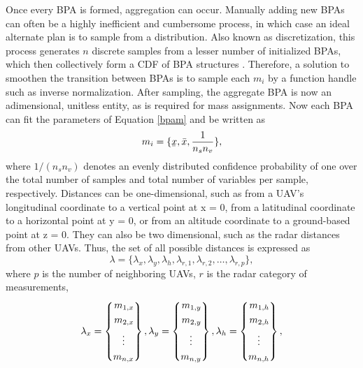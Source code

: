 \documentclass[12pt]{uthesis-v12}  %
\newcommand{\ubar}[1]{\underaccent{\bar}{#1}}
\begin{document}
Once every BPA is formed, aggregation can occur. Manually adding new BPAs can often be a highly inefficient and cumbersome process, in which case an ideal alternate plan is to sample from a distribution. Also known as discretization, this process generates $n$ discrete samples from a lesser number of initialized BPAs, which then collectively form a CDF of BPA structures \cite{tonon}. Therefore, a solution to smoothen the transition between BPAs is to sample each $m_i$ by a function handle such as inverse normalization. After sampling, the aggregate BPA is now an adimensional, unitless entity, as is required for mass assignments. Now each BPA can fit the parameters of Equation \ref{bpam} and be written as
\begin{equation}
m_i = \{\ubar{x}, \bar{x}, \frac{1}{n_s n_v}\},
\label{mi}
\end{equation}
where $1/(n_s n_v)$ denotes an evenly distributed confidence probability of one over the total number of samples and total number of variables per sample, respectively. Distances can be one-dimensional, such as from a UAV's longitudinal coordinate to a vertical point at x = 0, from a latitudinal coordinate to a horizontal point at y = 0, or from an altitude coordinate to a ground-based point at z = 0. They can also be two dimensional, such as the radar distances from other UAVs. Thus, the set of all possible distances is expressed as
\begin{equation}
\lambda = \{ \lambda_x, \lambda_y, \lambda_h, \lambda_{r,1}, \lambda_{r,2}, \dots, \lambda_{r,p} \},
\label{lambda}
\end{equation}
where $p$ is the number of neighboring UAVs, $r$ is the radar category of measurements,
\begin{equation}
\lambda_{x} = \left\{
\begin{aligned}
m_{1,x} \\
m_{2,x} \\
\vdotswithin{m_{n,x}} \\
m_{n,x} 
\end{aligned}
\right\},
\lambda_{y} = \left\{
\begin{aligned}
m_{1,y} \\
m_{2,y} \\
\vdotswithin{m_{n,y}} \\
m_{n,y} 
\end{aligned}
\right\},
\lambda_{h} = \left\{
\begin{aligned}
m_{1,h} \\
m_{2,h} \\
\vdotswithin{m_{n,h}} \\
m_{n,h}
\end{aligned}
\right\},
\label{m4}
\end{equation}
\end{document}
